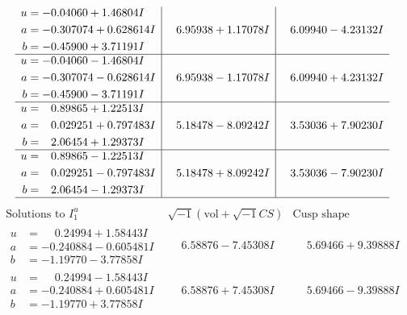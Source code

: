 \documentclass[1p]{elsarticle_modified}
\theoremstyle{definition}
\newcommand{\I}{\sqrt{-1}}
\begin{document}
$$\begin{array}{c|c|c}
\begin{aligned}
u &= -0.04060 + 1.46804 I \\
a &= -0.307074 + 0.628614 I \\
b &= -0.45900 + 3.71191 I\end{aligned}
 & \phantom{-}6.95938 + 1.17078 I & \phantom{-}6.09940 - 4.23132 I \\ \hline\begin{aligned}
u &= -0.04060 - 1.46804 I \\
a &= -0.307074 - 0.628614 I \\
b &= -0.45900 - 3.71191 I\end{aligned}
 & \phantom{-}6.95938 - 1.17078 I & \phantom{-}6.09940 + 4.23132 I \\ \hline\begin{aligned}
u &= \phantom{-}0.89865 + 1.22513 I \\
a &= \phantom{-}0.029251 + 0.797483 I \\
b &= \phantom{-}2.06454 + 1.29373 I\end{aligned}
 & \phantom{-}5.18478 - 8.09242 I & \phantom{-}3.53036 + 7.90230 I \\ \hline\begin{aligned}
u &= \phantom{-}0.89865 - 1.22513 I \\
a &= \phantom{-}0.029251 - 0.797483 I \\
b &= \phantom{-}2.06454 - 1.29373 I\end{aligned}
 & \phantom{-}5.18478 + 8.09242 I & \phantom{-}3.53036 - 7.90230 I\\
 \hline 
 \end{array}$$\newpage$$\begin{array}{c|c|c}  
\text{Solutions to }I^u_{1}& \I (\text{vol} + \sqrt{-1}CS) & \text{Cusp shape}\\
 \hline 
\begin{aligned}
u &= \phantom{-}0.24994 + 1.58443 I \\
a &= -0.240884 - 0.605481 I \\
b &= -1.19770 - 3.77858 I\end{aligned}
 & \phantom{-}6.58876 - 7.45308 I & \phantom{-}5.69466 + 9.39888 I \\ \hline\begin{aligned}
u &= \phantom{-}0.24994 - 1.58443 I \\
a &= -0.240884 + 0.605481 I \\
b &= -1.19770 + 3.77858 I\end{aligned}
 & \phantom{-}6.58876 + 7.45308 I & \phantom{-}5.69466 - 9.39888 I \\ \hline\begin{aligned}

\end{aligned}
\end{array}$$
\end{document}
